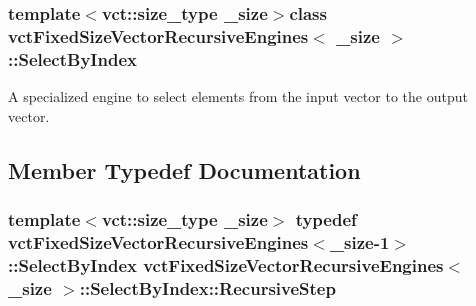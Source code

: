 \subsubsection*{template$<$vct\-::size\-\_\-type \-\_\-size$>$class vct\-Fixed\-Size\-Vector\-Recursive\-Engines$<$ \-\_\-size $>$\-::\-Select\-By\-Index}

A specialized engine to select elements from the input vector to the output vector. 

\subsection{Member Typedef Documentation}
\hypertarget{classvct_fixed_size_vector_recursive_engines_1_1_select_by_index_a1a6c0ae1c4db3cad550f893bf47e665d}{
\subsubsection[{Recursive\-Step}]{\setlength{\rightskip}{0pt plus 5cm}template$<$vct\-::size\-\_\-type \-\_\-size$>$ typedef {\bf vct\-Fixed\-Size\-Vector\-Recursive\-Engines}$<$\-\_\-size-\/1$>$\-::{\bf Select\-By\-Index} {\bf vct\-Fixed\-Size\-Vector\-Recursive\-Engines}$<$ \-\_\-size $>$\-::{\bf Select\-By\-Index\-::\-Recursive\-Step}}}\label{classvct_fixed_size_vector_recursive_engines_1_1_select_by_index_a1a6c0ae1c4db3cad550f893bf47e665d}


